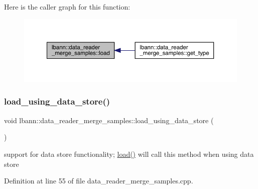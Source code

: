 Here is the caller graph for this function\+:\nopagebreak
\begin{figure}[H]
\begin{center}
\leavevmode
\includegraphics[width=350pt]{classlbann_1_1data__reader__merge__samples_ab3554341417f5eba95b9c1098af40410_icgraph}
\end{center}
\end{figure}
\mbox{\label{classlbann_1_1data__reader__merge__samples_ad45275b73fcbca47b74a9c9767f69bc9}} 
\subsubsection{\texorpdfstring{load\+\_\+using\+\_\+data\+\_\+store()}{load\_using\_data\_store()}}
{\footnotesize\ttfamily void lbann\+::data\+\_\+reader\+\_\+merge\+\_\+samples\+::load\+\_\+using\+\_\+data\+\_\+store (\begin{DoxyParamCaption}{ }\end{DoxyParamCaption})\hspace{0.3cm}{\ttfamily [protected]}}

support for data store functionality; \hyperlink{classlbann_1_1data__reader__merge__samples_ab3554341417f5eba95b9c1098af40410}{load()} will call this method when using data store 

Definition at line 55 of file data\+\_\+reader\+\_\+merge\+\_\+samples.\+cpp.


